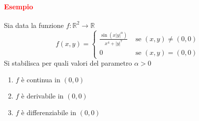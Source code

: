 \documentclass{article}
\newcommand{\R}{\mathbb{R}}
\begin{document}
\paragraph{\textcolor{red}{Esempio}}
Sia data la funzione $f: \R^2\rightarrow \R$
\begin{equation*}
    f(x,y)=\begin{cases}
        \frac{\sin(x|y|^\alpha)}{x^4+|y|^7}& \text{  se  }(x,y)\neq (0,0)\\
        0& \text{  se  } (x,y)=(0,0) 
    \end{cases}
\end{equation*}
Si stabilisca per quali valori del parametro $\alpha >0$
\begin{enumerate}
    \item $f$ è continua in $(0,0)$
    \item $f$ è derivabile in $(0,0)$
    \item $f$ è differenziabile in $(0,0)$
\end{enumerate}
\end{document}
